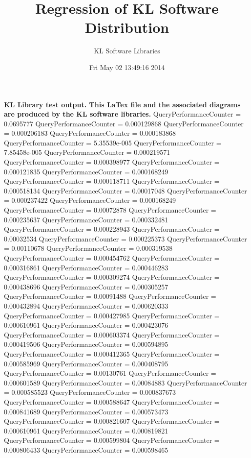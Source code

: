 \documentclass[9pt]{article}
\theoremstyle{plain}
\theoremstyle{definition}
\theoremstyle{remark}
\numberwithin{equation}{section}
\begin{document}
\title{Regression of KL Software Distribution   }
\author{KL Software Libraries}
\date{Fri May 02 13:49:16 2014
}
\maketitle
\textbf{ KL Library test output.  This LaTex file and the associated diagrams are produced by the KL software libraries.}
QueryPerformanceCounter  =  0.0695777
QueryPerformanceCounter  =  0.000129868
QueryPerformanceCounter  =  0.000206183
QueryPerformanceCounter  =  0.000183868
QueryPerformanceCounter  =  5.35539e-005
QueryPerformanceCounter  =  7.85458e-005
QueryPerformanceCounter  =  0.000219571
QueryPerformanceCounter  =  0.000398977
QueryPerformanceCounter  =  0.000121835
QueryPerformanceCounter  =  0.000168249
QueryPerformanceCounter  =  0.000118711
QueryPerformanceCounter  =  0.000518134
QueryPerformanceCounter  =  0.00017048
QueryPerformanceCounter  =  0.000237422
QueryPerformanceCounter  =  0.000168249
QueryPerformanceCounter  =  0.00072878
QueryPerformanceCounter  =  0.000235637
QueryPerformanceCounter  =  0.000332481
QueryPerformanceCounter  =  0.000228943
QueryPerformanceCounter  =  0.00032534
QueryPerformanceCounter  =  0.000225373
QueryPerformanceCounter  =  0.00110678
QueryPerformanceCounter  =  0.000319538
QueryPerformanceCounter  =  0.000454762
QueryPerformanceCounter  =  0.000316861
QueryPerformanceCounter  =  0.000446283
QueryPerformanceCounter  =  0.000309274
QueryPerformanceCounter  =  0.000438696
QueryPerformanceCounter  =  0.000305257
QueryPerformanceCounter  =  0.00091488
QueryPerformanceCounter  =  0.000432894
QueryPerformanceCounter  =  0.000620333
QueryPerformanceCounter  =  0.000427985
QueryPerformanceCounter  =  0.000610961
QueryPerformanceCounter  =  0.000423076
QueryPerformanceCounter  =  0.000603374
QueryPerformanceCounter  =  0.000419506
QueryPerformanceCounter  =  0.000594895
QueryPerformanceCounter  =  0.000412365
QueryPerformanceCounter  =  0.000585969
QueryPerformanceCounter  =  0.000408795
QueryPerformanceCounter  =  0.00130761
QueryPerformanceCounter  =  0.000601589
QueryPerformanceCounter  =  0.00084883
QueryPerformanceCounter  =  0.000585523
QueryPerformanceCounter  =  0.000837673
QueryPerformanceCounter  =  0.000588647
QueryPerformanceCounter  =  0.000841689
QueryPerformanceCounter  =  0.000573473
QueryPerformanceCounter  =  0.000821607
QueryPerformanceCounter  =  0.000610961
QueryPerformanceCounter  =  0.000819821
QueryPerformanceCounter  =  0.000599804
QueryPerformanceCounter  =  0.000806433
QueryPerformanceCounter  =  0.000598465
\end{document}
